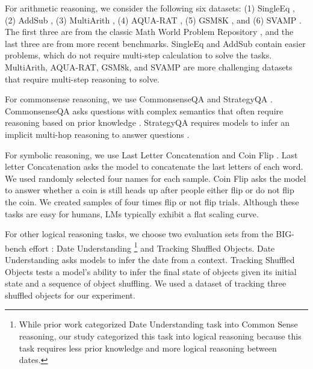 \documentclass{article}
\begin{document}
For arithmetic reasoning, we consider the following six datasets: (1) SingleEq \citep{singleeq}, (2) AddSub \citep{addsub}, (3) MultiArith \citep{multiarith}, (4) AQUA-RAT \citep{aqua}, (5) GSM8K \citep{gsm8k}, and (6) SVAMP \citep{svamp}. 
The first three are from the classic Math World Problem Repository \citep{mawps}, and the last three are from more recent benchmarks. 
SingleEq and AddSub contain easier problems, which do not require multi-step calculation to solve the tasks. 
MultiArith, AQUA-RAT, GSM8k, and SVAMP are more challenging datasets that require multi-step reasoning to solve.


For commonsense reasoning, we use CommonsenseQA \citep{commonsenseqa} and StrategyQA \citep{strategyqa}.
CommonsenseQA asks questions with complex semantics that often require reasoning based on prior knowledge \citep{commonsenseqa}. 
StrategyQA requires models to infer an implicit multi-hop reasoning to answer questions \citep{strategyqa}. 

For symbolic reasoning, we use Last Letter Concatenation and Coin Flip \citep{cot_wei}. Last letter Concatenation asks the model to concatenate the last letters of each word. We used randomly selected four names for each sample. Coin Flip asks the model to answer whether a coin is still heads up after people either flip or do not flip the coin.
We created samples of four times flip or not flip trials. 
Although these tasks are easy for humans, LMs typically exhibit a flat scaling curve. 

For other logical reasoning tasks, we choose two evaluation sets from the BIG-bench effort \citep{bigbench}: Date Understanding \footnote{While prior work \citep{cot_wei} categorized Date Understanding task into Common Sense reasoning, our study categorized this task into logical reasoning because this task requires less prior knowledge and more logical reasoning between dates.} and Tracking Shuffled Objects. 
Date Understanding asks models to infer the date from a context. 
Tracking Shuffled Objects tests a model's ability to infer the final state of objects given its initial state and a sequence of object shuffling. We used a dataset of tracking three shuffled objects for our experiment.
\end{document}
